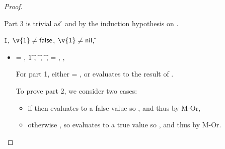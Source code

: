 \begin{lemma}
\begin{proof}
\begin{case}[B-IfFalse]
\begin{itemize}
\begin{subcase}[T-If]
              Part 3 is trivial as
              \opsem {\openv{}} {} {\v{}}
              and {\judgementtwo{}{\v{}}{\t{}}} by the induction hypothesis on {}.
      \end{subcase}
  \end{itemize}
\end{case}

\begin{case}[B-IfTrue]
        \opsem {\openv{}} {} {\v{1}},
              ${\v{1}} \not= {\false}$,
              ${\v{1}} \not= {\nil}$,
              \opsem {\openv{}} {} {\v{}}

  \begin{itemize}
    \item[]
      \begin{subcase}[T-If]
  \ep{} = { {} {}},
  \judgementrewrite {\propenv{}} {} {\t{1}} { {}}
                 {}
                 {},
                 {} {\t{}} { {}}
                 {\object{}}
                 {},
                 {} {\t{}} { {}}
                 {\object{}}
                 {},
  \e{} = { {} {}},
  ,

              For part 1, either \object{} = \emptyobject{}, or \e{} evaluates to the
              result of .

              To prove part 2, we consider two cases:
              \begin{itemize}
                \item if \isfalseval{\v{}}
                  then  evaluates to a false value so {}, and thus
                  {} by M-Or, 
                \item otherwise
                  \istrueval{\v{}},
                  so  evaluates to a true value so {}, and thus
                  {} by M-Or.
              \end{itemize}


\end{subcase}
\end{itemize}
\end{case}
\end{proof}
\end{lemma}

